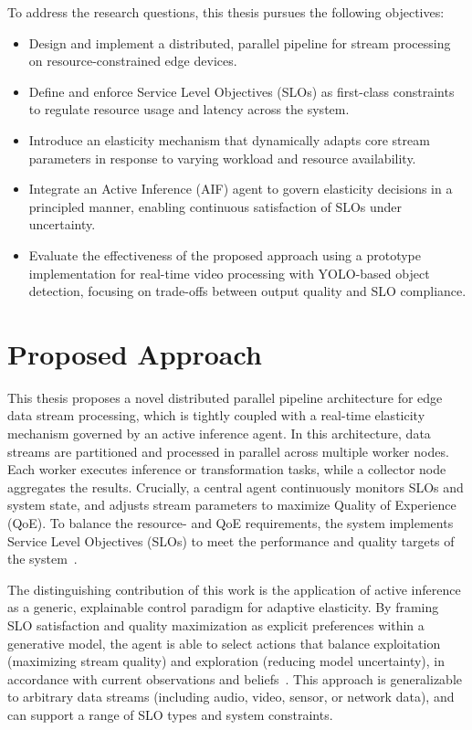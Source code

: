 To address the research questions, this thesis pursues the following objectives:

\begin{itemize}
    \item Design and implement a distributed, parallel pipeline for stream processing on resource-constrained edge devices.
    
    \item Define and enforce Service Level Objectives (SLOs) as first-class constraints to regulate resource usage and latency across the system.
    
    \item Introduce an elasticity mechanism that dynamically adapts core stream parameters in response to varying workload and resource availability.
    
    \item Integrate an Active Inference (AIF) agent to govern elasticity decisions in a principled manner, enabling continuous satisfaction of SLOs under uncertainty.
    
    \item Evaluate the effectiveness of the proposed approach using a prototype implementation for real-time video processing with YOLO-based object detection, focusing on trade-offs between output quality and SLO compliance.
\end{itemize}


\section{Proposed Approach}
This thesis proposes a novel distributed parallel pipeline architecture for edge data stream processing, which is tightly coupled with a real-time elasticity mechanism governed by an active inference agent. In this architecture, data streams are partitioned and processed in parallel across multiple worker nodes. Each worker executes inference or transformation tasks, while a collector node aggregates the results. Crucially, a central agent continuously monitors SLOs and system state, and adjusts stream parameters to maximize Quality of Experience (QoE). To balance the resource- and QoE requirements, the system implements Service Level Objectives (SLOs) to meet the performance and quality targets of the system~\cite{sedlak_towards_2025, nastic_sloc_2020}.

The distinguishing contribution of this work is the application of active inference as a generic,
explainable control paradigm for adaptive elasticity. By framing SLO satisfaction and quality maximization as explicit preferences within a generative model, the agent is able to select actions that balance exploitation (maximizing stream quality) and exploration (reducing model uncertainty), in accordance with current observations and beliefs~\cite{casamayor_pujol_deepslos_2024, sedlak_adaptive_2024, danilenka_adaptive_2025, lanillos_active_2021}. This approach is generalizable to arbitrary data streams (including audio, video, sensor, or network data), and can support a range of SLO types and system constraints.

